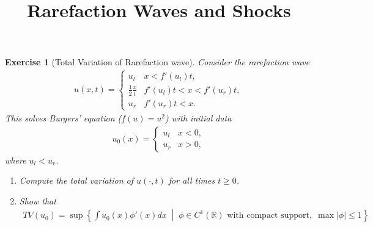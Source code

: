 \documentclass[10pt,letterpaper]{article}
\theoremstyle{break}
\newtheorem{exercise}{Exercise}
\begin{document}
\title{Rarefaction Waves and Shocks}
\date{}

\maketitle





























\begin{exercise}[Total Variation of Rarefaction wave]
    Consider the rarefaction wave 
    \begin{align}
     u(x,t)
     = 
     \left\{
     \begin{array}{ll}
        u_l & x < f'(u_l) t,
        \\
        \frac 1 2 \frac x t & f'(u_l)t < x < f'(u_r)t,
        \\
        u_r & f'(u_r)t < x.
     \end{array}
     \right.
    \end{align}
    This solves Burgers' equation ($f(u)=u^2$) with initial data 
    \begin{align}
     u_{0}(x)
     = 
     \left\{
     \begin{array}{cc}
        u_l & x < 0,
        \\
        u_r & x > 0,
     \end{array}
     \right.
    \end{align}
    where $u_l < u_r$. 
    \begin{enumerate}
     \item Compute the total variation of $u(\cdot,t)$ for all times $t \geq 0$.
     \item Show that
     \begin{align}
      TV(u_{0}) = \sup\left\{ \int u_0(x) \phi'(x) dx \;\middle|\; \phi \in C^{1}(\mathbb R) \text{ with compact support}, \; \max |\phi| \leq 1 \right\}
     \end{align}
    \end{enumerate}
\end{exercise}
\end{document}
